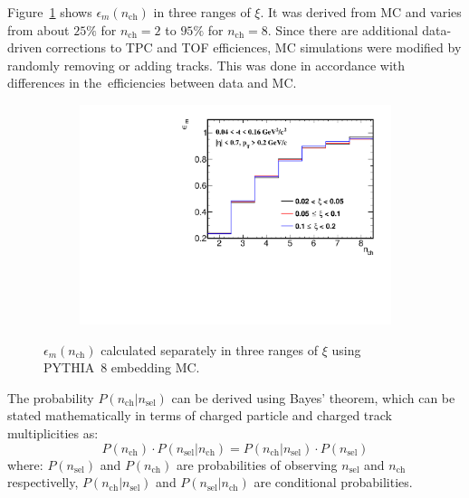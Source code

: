 Figure~\ref{fig:correctionSTAR} shows $\epsilon_{m}(n_\textrm{ch})$  in three ranges of $\xi$. It was derived from MC and varies from about $25\%$ for $n_\textrm{ch}=2$ to $95\%$ for $n_\textrm{ch}=8$. Since there are additional data-driven corrections to \ac{TPC} and TOF efficiences,  MC simulations were modified by randomly removing or adding tracks. This was done in accordance with differences in the~efficiencies between data and MC. 


\begin{figure}[h!]
	\centering
		\begin{subfigure}{.49\textwidth}
			\includegraphics[width=\textwidth,page=1]{chapters/chrgSTAR/img/unfolding/correction_0.pdf}
		\end{subfigure}
		\begin{minipage}{.49\textwidth}
			\caption{$\epsilon_{m}(n_\textrm{ch})$  calculated separately in three ranges of $\xi$ using PYTHIA~8 embedding MC.}
			\label{fig:correctionSTAR}
		\end{minipage}
	
\end{figure}

\noindent The  probability $P(n_\textrm{ch}|n_\textrm{sel})$ can be derived using Bayes' theorem, which can be stated mathematically in terms of charged particle and charged track multiplicities as:
\begin{equation}
P\left(n_\textrm{ch}\right)\cdot P\left(n_\textrm{sel}|n_\textrm{ch}\right) = P\left(n_\textrm{ch}|n_\textrm{sel}\right)\cdot P\left(n_\textrm{sel}\right)
\end{equation}
where: $P(n_\textrm{sel})$ and $P(n_\textrm{ch})$ are probabilities of observing $n_\textrm{sel}$ and $n_\textrm{ch}$ respectivelly, $P(n_\textrm{ch}|n_\textrm{sel})$ and $P(n_\textrm{sel}|n_\textrm{ch})$ are conditional probabilities.
 
